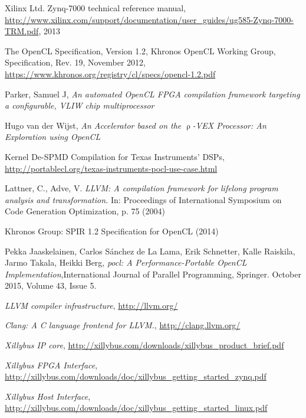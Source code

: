 \begin{thebibliography}{1}
	Xilinx Ltd. Zynq-7000 technical reference manual, \url{http://www.xilinx.com/support/documentation/user_guides/ug585-Zynq-7000-TRM.pdf}, 2013
	
	The OpenCL Specification, Version 1.2, Khronos OpenCL Working Group, Specification, Rev. 19, November 2012, \url{https://www.khronos.org/registry/cl/specs/opencl-1.2.pdf}
		
	Parker, Samuel J, \emph{An automated OpenCL FPGA compilation framework targeting a configurable, VLIW chip multiprocessor}
	
	Hugo van der Wijst, \emph{An Accelerator based on the $\uprho$-VEX Processor: An Exploration using OpenCL}
	
	Kernel De-SPMD Compilation for Texas Instruments' DSPs, \url{http://portablecl.org/texas-instruments-pocl-use-case.html}
	
	Lattner, C., Adve, V. \emph{LLVM: A compilation framework for lifelong program analysis and transformation.} In: Proceedings of International Symposium on Code Generation Optimization, p. 75 (2004)
	
	Khronos Group: SPIR 1.2 Specification for OpenCL (2014)
	
	Pekka Jaaskelainen, Carlos Sánchez de La Lama, Erik Schnetter, Kalle Raiskila, Jarmo Takala, Heikki Berg, \emph{pocl: A Performance-Portable OpenCL Implementation},International Journal of Parallel Programming, Springer. October 2015, Volume 43, Issue 5.
	
	\emph{LLVM compiler infrastructure}, \url{http://llvm.org/}
	
	\emph{Clang: A C language frontend for LLVM.}, \url{http://clang.llvm.org/}
	
	\emph{Xillybus IP core}, \url{http://xillybus.com/downloads/xillybus_product_brief.pdf}
	
	\emph{Xillybus FPGA Interface}, \url{http://xillybus.com/downloads/doc/xillybus_getting_started_zynq.pdf}
	
	\emph{Xillybus Host Interface}, \url{http://xillybus.com/downloads/doc/xillybus_getting_started_linux.pdf}	
	
\end{thebibliography}
